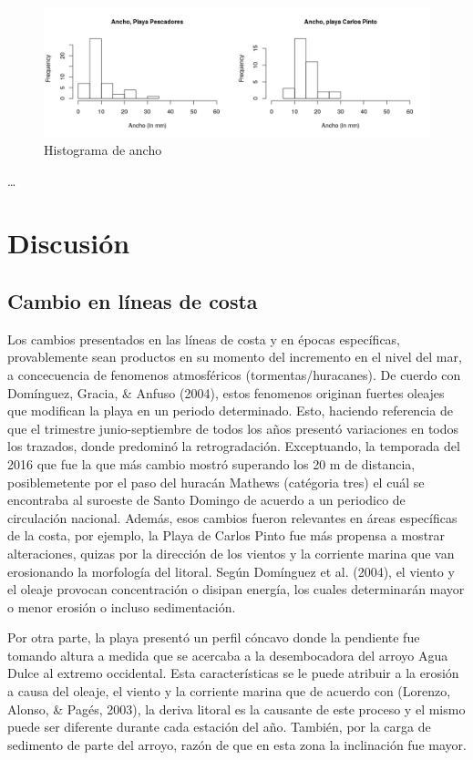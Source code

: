 \documentclass[11pt,]{article}
\begin{document}
\begin{figure}
\centering
\includegraphics{ancho_hist.png}
\caption{Histograma de ancho\label{ancho}}
\end{figure}

\ldots

\section{Discusión}\label{discusiuxf3n}

\subsection{Cambio en líneas de
costa}\label{cambio-en-luxedneas-de-costa}

Los cambios presentados en las líneas de costa y en épocas específicas,
provablemente sean productos en su momento del incremento en el nivel
del mar, a concecuencia de fenomenos atmosféricos (tormentas/huracanes).
De cuerdo con Domínguez, Gracia, \& Anfuso (2004), estos fenomenos
originan fuertes oleajes que modifican la playa en un periodo
determinado. Esto, haciendo referencia de que el trimestre
junio-septiembre de todos los años presentó variaciones en todos los
trazados, donde predominó la retrogradación. Exceptuando, la temporada
del 2016 que fue la que más cambio mostró superando los 20 m de
distancia, posiblemetente por el paso del huracán Mathews (catégoria
tres) el cuál se encontraba al suroeste de Santo Domingo de acuerdo a un
periodico de circulación nacional. Además, esos cambios fueron
relevantes en áreas específicas de la costa, por ejemplo, la Playa de
Carlos Pinto fue más propensa a mostrar alteraciones, quizas por la
dirección de los vientos y la corriente marina que van erosionando la
morfología del litoral. Según Domínguez et al. (2004), el viento y el
oleaje provocan concentración o disipan energía, los cuales determinarán
mayor o menor erosión o incluso sedimentación.

Por otra parte, la playa presentó un perfil cóncavo donde la pendiente
fue tomando altura a medida que se acercaba a la desembocadora del
arroyo Agua Dulce al extremo occidental. Esta características se le
puede atribuir a la erosión a causa del oleaje, el viento y la corriente
marina que de acuerdo con (Lorenzo, Alonso, \& Pagés, 2003), la deriva
litoral es la causante de este proceso y el mismo puede ser diferente
durante cada estación del año. También, por la carga de sedimento de
parte del arroyo, razón de que en esta zona la inclinación fue mayor.
\end{document}
